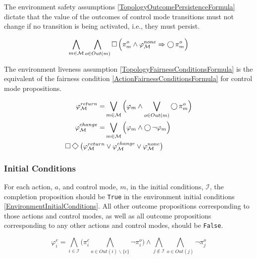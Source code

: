 The environment safety assumptions \eqref{TopologyOutcomePersistenceFormula} dictate that the value of the outcomes of control mode transitions must not change if no transition is being activated, i.e., they must persist.

\begin{equation}\label{TopologyOutcomePersistenceFormula}
	\bigwedge \limits_{m \in \mathcal{M}} \bigwedge \limits_{o \in Out(m)} \operatorname{\Box} \Big( \pi_m^o \wedge \varphi_\mathcal{M}^{none} \Rightarrow \operatorname{\bigcirc} \pi_m^o \Big)
\end{equation}

The environment liveness assumption \eqref{TopologyFairnessConditionsFormula} is the equivalent of the fairness condition \eqref{ActionFairnessConditionsFormula} for control mode propositions.

\begin{subequations}
	\begin{align}
		\varphi_\mathcal{M}^{return} = &\bigvee \limits_{m \in \mathcal{M}} \Big( \varphi_m \wedge \bigvee \limits_{o \in Out(m)} \LTLX \pi_m^o \Big)\label{TopologyFairnessConditionsFormula1}\\
		\varphi_\mathcal{M}^{change} = &\bigvee \limits_{m \in \mathcal{M}} \Big( \varphi_m \wedge \LTLX \lnot \varphi_m \Big)\label{TopologyFairnessConditionsFormula2}\\
		\LTLG \LTLF \big( \varphi_\mathcal{M}^{return} &\vee \varphi_\mathcal{M}^{change} \vee \varphi_\mathcal{M}^{none} \big)\label{TopologyFairnessConditionsFormula}
	\end{align}
\end{subequations}


\subsubsection{Initial Conditions}

For each action, $a$, and control mode, $m$, in the initial conditions, $\mathcal{I}$, the completion proposition should be \texttt{True} in the environment initial conditions \eqref{EnvironmentInitialConditions}.
All other outcome propositions corresponding to those actions and control modes, as well as all outcome propositions corresponding to any other actions and control modes, should be \texttt{False}.

\begin{equation}\label{EnvironmentInitialConditions}
	\varphi_i^e = \bigwedge \limits_{i \in \mathcal{I}} \Big( \pi_i^c \bigwedge \limits_{o \in Out(i)\backslash \{c\}} \lnot \pi_i^o \Big) \wedge \bigwedge \limits_{j \not\in \mathcal{I}} \bigwedge \limits_{o \in Out(j)} \lnot \pi_j^o
\end{equation}

